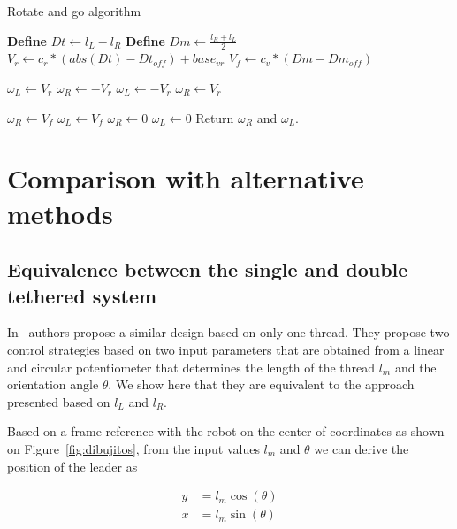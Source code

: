 \documentclass[journal]{IEEEtran}
\begin{document}
\begin{algorithm}[]
\caption{Rotate and go algorithm}
\begin{algorithmic}
\STATE \textbf{Define} $Dt \gets l_L - l_R$
\STATE \textbf{Define} $Dm \gets \frac{l_R+l_L}{2}$
\STATE $V_r \gets c_r * (abs(Dt) - Dt_{off}) + base_{vr}$ 
\STATE $V_f \gets c_v * (Dm - Dm_{off})$

\STATE $\omega_{L} \gets V_r$
\STATE $\omega_{R} \gets -V_r$
\ELSE
\STATE $\omega_{L} \gets -V_r$
\STATE $\omega_{R} \gets V_r$
\ENDIF

\ELSE
{}
\STATE $\omega_{R} \gets V_f$
\STATE $\omega_{L} \gets V_f$
\ELSE
\STATE $\omega_{R} \gets 0$
\STATE $\omega_{L} \gets 0$
\ENDIF
\ENDIF
\STATE Return $\omega_{R}$ and $\omega_{L}$.
\end{algorithmic}
\label{alg:rotateandgoalg}
\end{algorithm}

\section{Comparison with alternative methods} \label{Comparison}

\subsection{Equivalence between the single and double tethered system}


In~\cite{Endo2015} authors propose a similar design based on only one thread.  They propose two control strategies based on two input parameters that are obtained from a linear and circular potentiometer that determines the length of the thread $l_m$ and the orientation angle $\theta$.  We show here that they are equivalent to the approach presented based on $l_L$ and  $l_R$.

Based on a frame reference with the robot on the center of coordinates as shown on Figure~\ref{fig:dibujitos}, from the input values $l_m$ and $\theta$ we can derive the position of the leader as

\begin{align*}
   y &= l_m  \cos(\theta)\\
   x &= l_m  \sin(\theta) \\
\end{align*}
\end{document}
